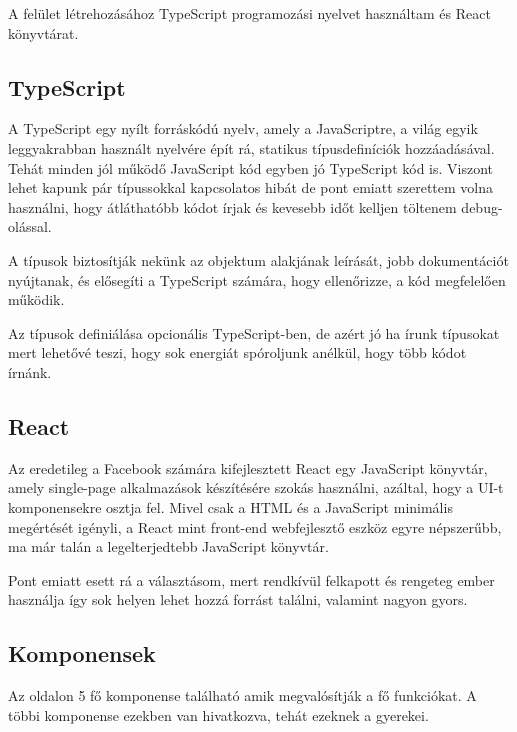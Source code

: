 

A felület létrehozásához TypeScript \cite{typescript} programozási nyelvet használtam és React \cite{react} könyvtárat.

\subsection{TypeScript}

A TypeScript egy nyílt forráskódú nyelv, amely a JavaScriptre, a világ egyik leggyakrabban használt nyelvére épít rá, statikus típusdefiníciók hozzáadásával. Tehát minden jól működő JavaScript kód egyben jó TypeScript kód is. Viszont lehet kapunk pár típussokkal kapcsolatos hibát de pont emiatt szerettem volna használni, hogy átláthatóbb kódot írjak és kevesebb időt kelljen töltenem debug-olással. \bigskip

A típusok biztosítják nekünk az objektum alakjának leírását, jobb dokumentációt nyújtanak, és elősegíti a TypeScript számára, hogy ellenőrizze, a kód megfelelően működik.\bigskip

Az típusok definiálása opcionális TypeScript-ben, de azért jó ha írunk típusokat mert lehetővé teszi, hogy sok energiát spóroljunk anélkül, hogy több kódot írnánk.

\subsection{React}

Az eredetileg a Facebook számára kifejlesztett React egy JavaScript könyvtár, amely single-page alkalmazások készítésére szokás használni, azáltal, hogy a UI-t komponensekre osztja fel. Mivel csak a HTML és a JavaScript  minimális megértését igényli, a React mint front-end webfejlesztő eszköz egyre népszerűbb, ma már talán a legelterjedtebb JavaScript könyvtár. \bigskip

Pont emiatt esett rá a választásom, mert rendkívül felkapott és rengeteg ember használja így sok helyen lehet hozzá forrást találni, valamint nagyon gyors.

\subsection{Komponensek}

Az oldalon 5 fő komponense található amik megvalósítják a fő funkciókat. A többi komponense ezekben van hivatkozva, tehát ezeknek a gyerekei.


